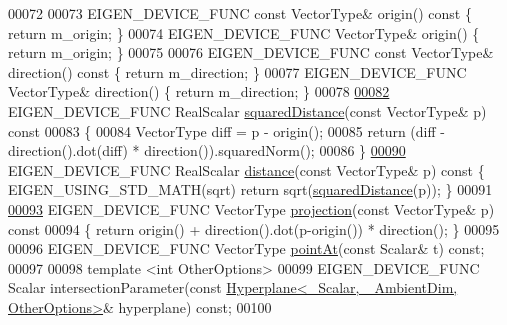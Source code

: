 \begin{DoxyCode}
00072 
00073   EIGEN\_DEVICE\_FUNC \textcolor{keyword}{const} VectorType& origin()\textcolor{keyword}{ const }\{ \textcolor{keywordflow}{return} m\_origin; \}
00074   EIGEN\_DEVICE\_FUNC VectorType& origin() \{ \textcolor{keywordflow}{return} m\_origin; \}
00075 
00076   EIGEN\_DEVICE\_FUNC \textcolor{keyword}{const} VectorType& direction()\textcolor{keyword}{ const }\{ \textcolor{keywordflow}{return} m\_direction; \}
00077   EIGEN\_DEVICE\_FUNC VectorType& direction() \{ \textcolor{keywordflow}{return} m\_direction; \}
00078 
\hyperlink{group___geometry___module_a7dc9009fd67184754823cf90ae8f6eae}{00082}   EIGEN\_DEVICE\_FUNC RealScalar \hyperlink{group___geometry___module_a7dc9009fd67184754823cf90ae8f6eae}{squaredDistance}(\textcolor{keyword}{const} VectorType& p)\textcolor{keyword}{ const}
00083 \textcolor{keyword}{  }\{
00084     VectorType diff = p - origin();
00085     \textcolor{keywordflow}{return} (diff - direction().dot(diff) * direction()).squaredNorm();
00086   \}
\hyperlink{group___geometry___module_a1c038c9559f76794369bd2ae74e93b9f}{00090}   EIGEN\_DEVICE\_FUNC RealScalar \hyperlink{group___geometry___module_a1c038c9559f76794369bd2ae74e93b9f}{distance}(\textcolor{keyword}{const} VectorType& p)\textcolor{keyword}{ const }\{ EIGEN\_USING\_STD\_MATH(sqrt) \textcolor{keywordflow}{
      return} sqrt(\hyperlink{group___geometry___module_a7dc9009fd67184754823cf90ae8f6eae}{squaredDistance}(p)); \}
00091 
\hyperlink{group___geometry___module_a3c7a7a3db3d4380c538d55fc8df77f87}{00093}   EIGEN\_DEVICE\_FUNC VectorType \hyperlink{group___geometry___module_a3c7a7a3db3d4380c538d55fc8df77f87}{projection}(\textcolor{keyword}{const} VectorType& p)\textcolor{keyword}{ const}
00094 \textcolor{keyword}{  }\{ \textcolor{keywordflow}{return} origin() + direction().dot(p-origin()) * direction(); \}
00095 
00096   EIGEN\_DEVICE\_FUNC VectorType \hyperlink{group___geometry___module_ae0a510cc78156974ab5a7fb8a6b2326a}{pointAt}(\textcolor{keyword}{const} Scalar& t) \textcolor{keyword}{const};
00097   
00098   \textcolor{keyword}{template} <\textcolor{keywordtype}{int} OtherOptions>
00099   EIGEN\_DEVICE\_FUNC Scalar intersectionParameter(\textcolor{keyword}{const} 
      \hyperlink{group___geometry___module_class_eigen_1_1_hyperplane}{Hyperplane<\_Scalar, \_AmbientDim, OtherOptions>}& hyperplane) \textcolor{keyword}{
      const};
00100  

\end{DoxyCode}
